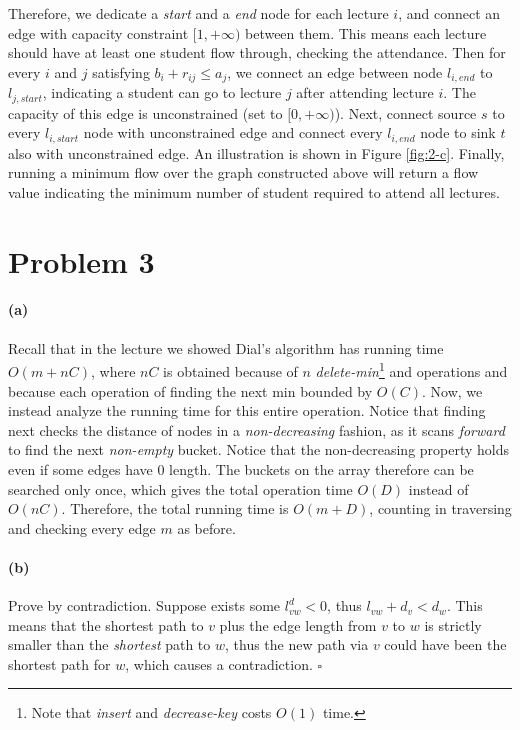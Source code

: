 \documentclass[12pt]{article}
\begin{document}
Therefore, we dedicate a \emph{start} and a \emph{end} node for each lecture $i$, and connect an edge with capacity constraint $[1, +\infty)$ between them. This means each lecture should have at least one student flow through, checking the attendance. Then for every $i$ and $j$ satisfying $b_i + r_{ij} \leq a_j$, we connect an edge between node $l_{i,end}$ to $l_{j,start}$, indicating a student can go to lecture $j$ after attending lecture $i$. The capacity of this edge is unconstrained (set to $[0, +\infty)$). Next, connect source $s$ to every $l_{i,start}$ node with unconstrained edge and connect every $l_{i,end}$ node to sink $t$ also with unconstrained edge. An illustration is shown in Figure \ref{fig:2-c}. Finally, running a minimum flow over the graph constructed above will return a flow value indicating the minimum number of student required to attend all lectures.
 \pagebreak
  
\section*{Problem 3}
\paragraph{(a)} Recall that in the lecture we showed Dial's algorithm has running time $O(m+nC)$, where $nC$ is obtained because of $n$ \emph{delete-min}\footnote{Note that \emph{insert} and \emph{decrease-key} costs $O(1)$ time.} and operations and because each operation of finding the next min bounded by $O(C)$. Now, we instead analyze the running time for this entire operation. Notice that finding next checks the distance of nodes in a \emph{non-decreasing} fashion, as it scans \emph{forward} to find the next \emph{non-empty} bucket. Notice that the non-decreasing property holds even if some edges have 0 length. The buckets on the array therefore can be searched only once, which gives the total operation time $O(D)$ instead of $O(nC)$. Therefore, the total running time is $O(m+D)$, counting in traversing and checking every edge $m$ as before.  

\paragraph{(b)} Prove by contradiction. Suppose exists some $l_{vw}^d < 0$, thus $l_{vw} + d_v < d_w$. This means that the shortest path to $v$ plus the edge length from $v$ to $w$ is strictly smaller than the \emph{shortest} path to $w$, thus the new path via $v$ could have been the shortest path for $w$, which causes a contradiction. $\square$
\end{document}
